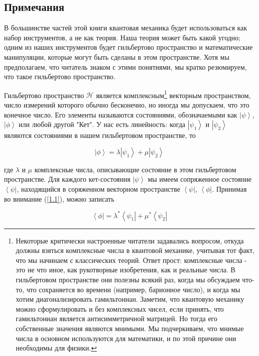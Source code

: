 \documentclass[main.tex]{subfiles}
\begin{document}
\subsection{Примечания}\label{ch1.6}

В большинстве частей этой книги квантовая механика будет использоваться как набор инструментов, а не как теория. Наша теория может быть какой угодно; одним из наших инструментов будет гильбертово пространство и математические манипуляции, которые могут быть сделаны в этом пространстве. Хотя мы предполагаем, что читатель знаком с этими понятиями, мы кратко резюмируем, что такое гильбертово пространство. 

Гильбертово пространство $\mathcal{H}$ является комплексным\footnote{Некоторые критически настроенные читатели задавались вопросом, откуда должны взяться комплексные числа в квантовой механике, учитывая тот факт, что мы начинаем с классических теорий. Ответ прост: комплексные числа - это не что иное, как рукотворные изобретения, как и реальные числа. В гильбертовом пространстве они полезны всякий раз, когда мы обсуждаем что-то, что сохраняется во времени (например, барионное число), и когда мы хотим диагонализировать гамильтониан. Заметим, что квантовую механику можно сформулировать и без комплексных чисел, если принять, что гамильтониан является антисимметричной матрицей. Но тогда его собственные значения являются мнимыми. Мы подчеркиваем, что мнимые числа в основном используются для математики, и по этой причине они необходимы для физики.} векторным пространством, число измерений которого обычно бесконечно, но иногда мы допускаем, что это конечное число. Его элементы называются состояниями, обозначаемыми как $\left|\psi\right>$, $\left|\phi\right>$ или любой другой "Кет". У нас есть линейность: когда $\left|\psi_1\right>$ и $\left|\psi_2\right>$ являются состояниями в нашем гильбертовом пространстве, то

\begin{equation}\label{1.1}
	\left|\phi\right> = \lambda \left|\psi_1\right> + \mu\left|\psi_2\right>
\end{equation}

где $\lambda$ и $\mu$ комплексные числа, описывающие состояние в этом гильбертовом пространстве. Для каждого кет-состояния $\left|\psi\right>$ мы имеем сопряженное состояние $\left<\psi\right|$, находящийся в соряженном векторном пространстве $\left<\psi\right|$, $\left<\phi\right|$. Принимая во внимание (\ref{1.1}), можно записать

\begin{equation}\label{lincombconj}
	\left<\phi\right| = \lambda^* \left<\psi_1\right| + \mu^*\left<\psi_2\right|
\end{equation}
\end{document}
